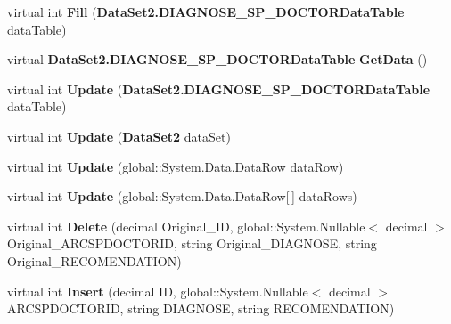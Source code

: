 \begin{CompactItemize}
\item 
virtual int \textbf{Fill} ({\bf DataSet2.DIAGNOSE\_\-SP\_\-DOCTORDataTable} dataTable)\label{class_automatic_medical_system_1_1_data_set2_table_adapters_1_1_d_i_a_g_n_o_s_e___s_p___d_o_c_t_o_r_table_adapter_a23fa6a9910b644d1907425fcdd658ab}

\item 
virtual {\bf DataSet2.DIAGNOSE\_\-SP\_\-DOCTORDataTable} \textbf{GetData} ()\label{class_automatic_medical_system_1_1_data_set2_table_adapters_1_1_d_i_a_g_n_o_s_e___s_p___d_o_c_t_o_r_table_adapter_a708f506390d89046d9e06549d35958d}

\item 
virtual int \textbf{Update} ({\bf DataSet2.DIAGNOSE\_\-SP\_\-DOCTORDataTable} dataTable)\label{class_automatic_medical_system_1_1_data_set2_table_adapters_1_1_d_i_a_g_n_o_s_e___s_p___d_o_c_t_o_r_table_adapter_2ba777c3e1fd820e266415939833a364}

\item 
virtual int \textbf{Update} ({\bf DataSet2} dataSet)\label{class_automatic_medical_system_1_1_data_set2_table_adapters_1_1_d_i_a_g_n_o_s_e___s_p___d_o_c_t_o_r_table_adapter_39b1e1e7af65ba969ef5a33a7df5b270}

\item 
virtual int \textbf{Update} (global::System.Data.DataRow dataRow)\label{class_automatic_medical_system_1_1_data_set2_table_adapters_1_1_d_i_a_g_n_o_s_e___s_p___d_o_c_t_o_r_table_adapter_53410c5ba529b537e02dde63c513ee96}

\item 
virtual int \textbf{Update} (global::System.Data.DataRow[$\,$] dataRows)\label{class_automatic_medical_system_1_1_data_set2_table_adapters_1_1_d_i_a_g_n_o_s_e___s_p___d_o_c_t_o_r_table_adapter_e31151598ea73faf174bc8552873f227}

\item 
virtual int \textbf{Delete} (decimal Original\_\-ID, global::System.Nullable$<$ decimal $>$ Original\_\-ARCSPDOCTORID, string Original\_\-DIAGNOSE, string Original\_\-RECOMENDATION)\label{class_automatic_medical_system_1_1_data_set2_table_adapters_1_1_d_i_a_g_n_o_s_e___s_p___d_o_c_t_o_r_table_adapter_f29d6830b4450ac9e971f71132b3d4a8}

\item 
virtual int \textbf{Insert} (decimal ID, global::System.Nullable$<$ decimal $>$ ARCSPDOCTORID, string DIAGNOSE, string RECOMENDATION)\label{class_automatic_medical_system_1_1_data_set2_table_adapters_1_1_d_i_a_g_n_o_s_e___s_p___d_o_c_t_o_r_table_adapter_80a751537af2e938a118db3df497ef89}


\end{CompactItemize}
